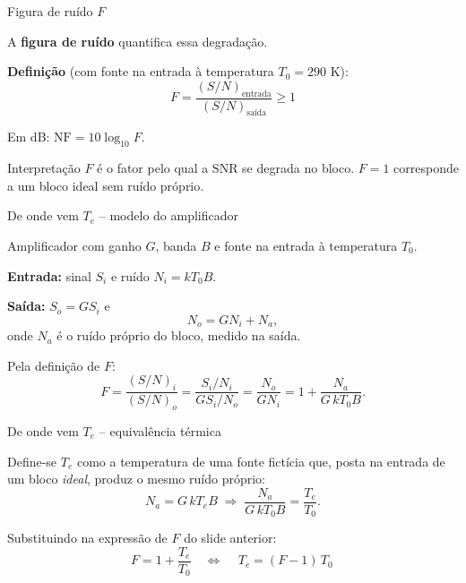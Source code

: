 
\begin{frame}{Figura de ruído $F$}

A \textbf{figura de ruído} quantifica essa degradação.

\textbf{Definição} (com fonte na entrada à temperatura $T_0 = 290$ K):
\[
F = \frac{(S/N)_{\text{entrada}}}{(S/N)_{\text{saída}}} \ge 1
\]

Em dB: $\mathrm{NF} = 10\log_{10} F$.

\vspace{0.3cm}

\begin{block}{Interpretação}
$F$ é o fator pelo qual a SNR se degrada no bloco. $F = 1$ corresponde a um bloco ideal sem ruído próprio.
\end{block}

\end{frame}


\begin{frame}{De onde vem $T_e$ -- modelo do amplificador}

Amplificador com ganho $G$, banda $B$ e fonte na entrada à temperatura $T_0$.

\textbf{Entrada:} sinal $S_i$ e ruído $N_i = k T_0 B$.

\textbf{Saída:} $S_o = G S_i$ e
\[
N_o = G N_i + N_a,
\]
onde $N_a$ é o ruído próprio do bloco, medido na saída.

Pela definição de $F$:
\[
F = \frac{(S/N)_i}{(S/N)_o} = \frac{S_i/N_i}{G S_i / N_o} = \frac{N_o}{G N_i} = 1 + \frac{N_a}{G\, k T_0 B}.
\]

\end{frame}


\begin{frame}{De onde vem $T_e$ -- equivalência térmica}

Define-se $T_e$ como a temperatura de uma fonte fictícia que, posta na entrada de um bloco \emph{ideal}, produz o mesmo ruído próprio:
\[
N_a = G\, k T_e B \;\Longrightarrow\; \frac{N_a}{G\, k T_0 B} = \frac{T_e}{T_0}.
\]

Substituindo na expressão de $F$ do slide anterior:
\[
F = 1 + \frac{T_e}{T_0} \quad\Longleftrightarrow\quad \boxed{\,T_e = (F-1)\, T_0\,}
\]

\end{frame}

